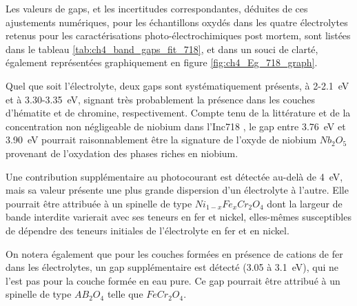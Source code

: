 \begin{refsection}
    Les valeurs de gaps, et les incertitudes correspondantes, déduites de ces ajustements numériques, pour les échantillons
    oxydés dans les quatre électrolytes retenus pour les caractérisations photo-électrochimiques post mortem, sont listées
    dans le tableau \ref{tab:ch4_band_gaps_fit_718}, et dans
    un souci de clarté, également représentées graphiquement en figure \ref{fig:ch4_Eg_718_graph}.


    Quel que soit l’électrolyte, deux gaps sont systématiquement présents, 
    à 2-2.1~eV et à 3.30-3.35~eV, signant très probablement la présence dans
    les couches d’hématite et de chromine, respectivement. Compte tenu de la
    littérature et de la concentration non négligeable de niobium dans l’Inc718 \citep{Liu1999}, le gap
    entre 3.76~eV et 3.90~eV pourrait raisonnablement être la signature de l’oxyde de
    niobium $Nb_2O_5$ \citep{LaMantia2010} provenant de l’oxydation des phases riches en niobium.
    
    Une contribution supplémentaire au photocourant est détectée au-delà de 4~eV, mais 
    sa valeur présente une plus grande dispersion d’un électrolyte à l’autre. Elle 
    pourrait être attribuée à un spinelle de type $Ni_{1-x}Fe_xCr_2O_4$ dont la largeur
    de bande interdite varierait avec ses teneurs en fer et nickel, elles-mêmes susceptibles
    de dépendre des teneurs initiales de l’électrolyte en fer et en nickel.
    
    On notera également que pour les couches formées en présence de cations de 
    fer dans les électrolytes, un gap supplémentaire est détecté (3.05 à 3.1~eV), qui
    ne l’est pas pour la couche formée en eau pure. Ce gap pourrait être attribué à 
    un spinelle de type $AB_2O_4$ telle que $FeCr_2O_4$. 


\end{refsection}
